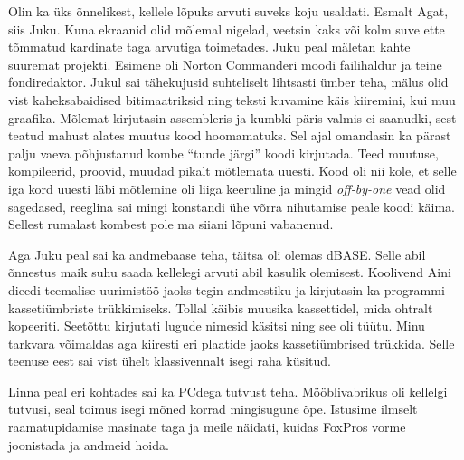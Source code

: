 Olin ka üks õnnelikest, kellele lõpuks arvuti suveks koju usaldati. Esmalt Agat, siis Juku. Kuna ekraanid olid mõlemal nigelad, veetsin kaks või kolm suve ette tõmmatud kardinate taga arvutiga toimetades. Juku peal mäletan kahte suuremat projekti. Esimene oli Norton Commanderi moodi failihaldur ja teine fondiredaktor. Jukul sai tähekujusid suhteliselt lihtsasti ümber teha, mälus olid vist kaheksabaidised bitimaatriksid ning teksti kuvamine käis kiiremini, kui muu graafika. Mõlemat kirjutasin assembleris ja kumbki päris valmis ei saanudki, sest teatud mahust alates muutus kood hoomamatuks. Sel ajal omandasin ka pärast palju vaeva põhjustanud kombe \enquote{tunde järgi} koodi kirjutada. Teed muutuse, kompileerid, proovid, muudad pikalt mõtlemata uuesti. Kood oli nii kole, et selle iga kord uuesti läbi mõtlemine oli liiga keeruline ja mingid \emph{off-by-one} vead olid sagedased, reeglina sai mingi konstandi ühe võrra nihutamise peale koodi käima. Sellest rumalast kombest pole ma siiani lõpuni vabanenud. 

Aga Juku peal sai ka andmebaase teha, täitsa oli olemas dBASE. Selle abil õnnestus maik suhu saada kellelegi arvuti abil kasulik olemisest. Koolivend Aini dieedi-teemalise uurimistöö jaoks tegin andmestiku ja kirjutasin ka programmi kassetiümbriste trükkimiseks. Tollal käibis muusika kassettidel, mida ohtralt kopeeriti. Seetõttu kirjutati lugude nimesid käsitsi ning see oli tüütu. Minu tarkvara võimaldas aga kiiresti eri plaatide jaoks kassetiümbrised trükkida. Selle teenuse eest sai vist ühelt klassivennalt isegi raha küsitud.

Linna peal eri kohtades sai ka PCdega tutvust teha. Mööblivabrikus oli kellelgi tutvusi, seal toimus isegi mõned korrad mingisugune õpe. Istusime ilmselt raamatupidamise masinate taga ja meile näidati, kuidas FoxPros vorme joonistada ja andmeid hoida. 

